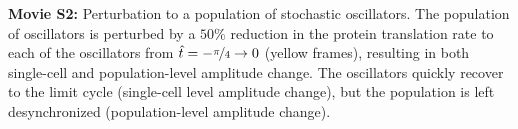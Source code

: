 \documentclass[11pt, letterpaper]{article}
\begin{document}
{\bfseries Movie S2:} Perturbation to a population of stochastic oscillators.
The population of oscillators is perturbed by a $50\%$ reduction in the protein translation rate to each of the oscillators from $\hat{t} = -\nicefrac{\pi}{4} \to 0$ (yellow frames), resulting in both single-cell and population-level amplitude change.
The oscillators quickly recover to the limit cycle (single-cell level amplitude change), but the population is left desynchronized (population-level amplitude change).

\renewcommand{\refname}{Supporting References}


\end{document}
